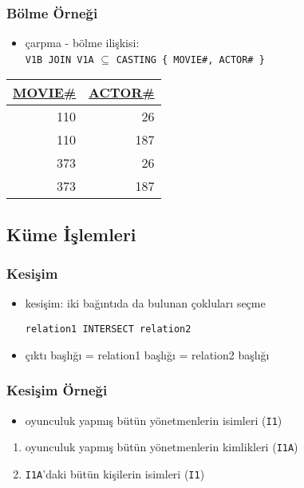 \documentclass[dvipsnames]{beamer}
\theoremstyle{plain}
\begin{document}
\begin{frame}[fragile]
  \frametitle{Bölme Örneği}

  \begin{itemize}
    \item çarpma - bölme ilişkisi:\\
      \lstinline!V1B JOIN V1A! $\subseteq$
      \lstinline!CASTING { MOVIE#, ACTOR# }!
  \end{itemize}

  \begin{tiny}
  \begin{table}
    \begin{tabular}{|r|r|}\hline
\underline{MOVIE\#} & \underline{ACTOR\#}\\[2pt]\hline\hline
                110 &                  26\\\hline
                110 &                 187\\\hline
                373 &                  26\\\hline
                373 &                 187\\\hline
    \end{tabular}
  \end{table}
  \end{tiny}
\end{frame}
 
\subsection{Küme İşlemleri}

\begin{frame}[fragile]
  \frametitle{Kesişim}

  \begin{itemize}
    \item \alert{kesişim}: iki bağıntıda da bulunan çokluları seçme

    \begin{lstlisting}
relation1 INTERSECT relation2
    \end{lstlisting}

  \medskip
    \item çıktı başlığı = relation1 başlığı = relation2 başlığı
  \end{itemize}
\end{frame}

\begin{frame}
  \frametitle{Kesişim Örneği}

    \begin{itemize}
      \item oyunculuk yapmış bütün yönetmenlerin isimleri (\texttt{I1})
    \end{itemize}

    \pause
    \begin{enumerate}
      \item oyunculuk yapmış bütün yönetmenlerin kimlikleri (\texttt{I1A})
      \item \texttt{I1A}'daki bütün kişilerin isimleri (\texttt{I1})
    \end{enumerate}
\end{frame}
\end{document}
